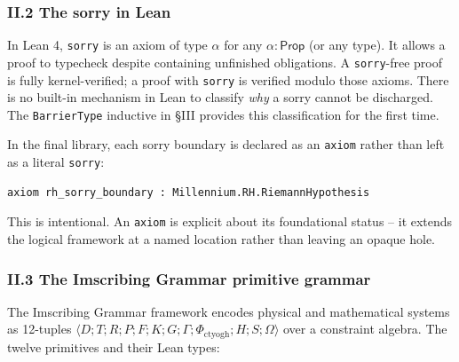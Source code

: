 \documentclass[12pt,a4paper]{article}
\newcommand{\pilcrow}{\S}
\begin{document}
\subsubsection{II.2 The sorry in Lean}

In Lean 4, \texttt{sorry} is an axiom of type $\alpha$ for any $\alpha : \mathsf{Prop}$ (or any type). It allows a proof to typecheck despite containing unfinished obligations. A \texttt{sorry}-free proof is fully kernel-verified; a proof with \texttt{sorry} is verified modulo those axioms. There is no built-in mechanism in Lean to classify \emph{why} a sorry cannot be discharged. The \texttt{BarrierType} inductive in \pilcrow{}III provides this classification for the first time.

In the final library, each sorry boundary is declared as an \texttt{axiom} rather than left as a literal \texttt{sorry}:

\begin{lstlisting}[language=lean]
axiom rh_sorry_boundary : Millennium.RH.RiemannHypothesis
\end{lstlisting}

This is intentional. An \texttt{axiom} is explicit about its foundational status  --  it extends the logical framework at a named location rather than leaving an opaque hole.

\subsubsection{II.3 The Imscribing Grammar primitive grammar}

The Imscribing Grammar framework encodes physical and mathematical systems as 12-tuples $\langle D; T; R; P; F; K; G; \Gamma; \Phi_{\text{ctyogh}}; H; S; \Omega \rangle$ over a constraint algebra. The twelve primitives and their Lean types:
\end{document}
